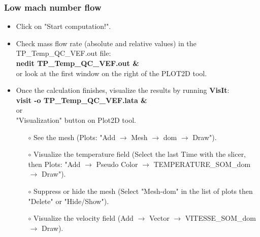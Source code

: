 \documentclass[10pt, hyperref={unicode=true,pdfusetitle, bookmarks=true,bookmarksnumbered=false,bookmarksopen=false, breaklinks=false,pdfborder={0 0 1},backref=true,colorlinks=true,linkcolor=darkblue,pageanchor}]{beamer}
\begin{document}
\begin{frame}
\frametitle{Low mach number flow}
\begin{block}{}

\begin{itemize}
\item Click on "Start computation!".
\item Check mass flow rate (absolute and relative values) in the TP\_Temp\_QC\_VEF.out file: \\
\textbf{nedit TP\_Temp\_QC\_VEF.out \&} \\
or look at the first window on the right of the PLOT2D tool.

\item Once the calculation finishes, visualize the results by running \textbf{VisIt}:\\
\textbf{visit -o TP\_Temp\_QC\_VEF.lata \&}\\
or \\
"Visualization" button on Plot2D tool.
\begin{itemize}
    \item [$\circ$] See the mesh (Plots: "Add $\rightarrow$ Mesh $\rightarrow$ dom $\rightarrow$ Draw").
    \item [$\circ$] Visualize the temperature field (Select the last Time with the slicer, then Plots: "Add $\rightarrow$ Pseudo Color $\rightarrow$ TEMPERATURE\_SOM\_dom  $\rightarrow$ Draw").
    \item [$\circ$] Suppress or hide the mesh (Select "Mesh-dom" in the list of plots then "Delete" or "Hide/Show").
    \item [$\circ$] Visualize the velocity field (Add $\rightarrow$ Vector $\rightarrow$ VITESSE\_SOM\_dom $\rightarrow$ Draw).
\end{itemize}

\end{itemize}

\end{block}
\end{frame}
\end{document}
